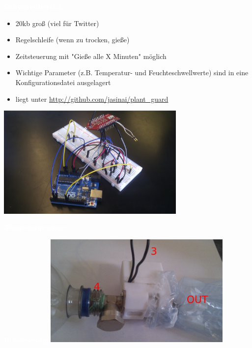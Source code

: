 \documentclass[bigger]{beamer}
\newcommand{\topic}[1]{{\huge{\textcolor{white}{\textbf{#1}}}}}
\begin{document}
\begin{frame}{\topic{Softwareübersicht}}
	\begin{itemize}
		\item 20kb groß (viel für Twitter)
		\item Regelschleife (wenn zu trocken, gieße)
		\item Zeitsteuerung mit "Gieße alle X Minuten" möglich
      \item Wichtige Parameter (z.B. Temperatur- und Feuchteschwellwerte) sind in eine Konfigurationsdatei ausgelagert
		\item liegt unter \url{http://github.com/jasinai/plant\_guard}
	\end{itemize}
\end{frame}



\begin{frame}
\includegraphics[width=350px]{board.jpg}
\end{frame}
\begin{frame}{\topic{Temperatursensor}}
\end{frame}

\begin{frame}{\topic{Bewässerung}}
       \includegraphics[width=350px]{Anschluss.jpg}
\end{frame}
\end{document}
